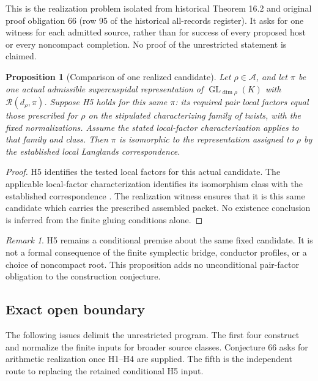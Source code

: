 \documentclass[11pt]{amsart}
\newtheorem{proposition}[proposition]{Proposition}
\theoremstyle{definition}
\theoremstyle{remark}
\newtheorem{remark}[remark]{Remark}
\newcommand{\GL}{\operatorname{GL}}
\begin{document}
\noindent This is the realization problem isolated from historical
Theorem 16.2 and original proof obligation 66 (row 95 of the historical
all-records register). It asks for one witness for each
admitted source, rather than for success of every proposed host or every
noncompact completion. No proof of the unrestricted statement is claimed.

\begin{proposition}[Comparison of one realized candidate]
\label{prop:realized_candidate_comparison}
Let \(\rho\in\mathcal A\), and let \(\pi\) be one actual admissible
supercuspidal representation of \(\GL_{\dim\rho}(K)\) with
\(\mathcal R(d_\rho,\pi)\). Suppose H5 holds for this same \(\pi\):
its required pair local factors equal those prescribed for \(\rho\)
on the stipulated characterizing family of twists, with the fixed
normalizations. Assume the stated local-factor characterization applies
to that family and class. Then \(\pi\) is isomorphic to the representation
assigned to \(\rho\) by the established local Langlands correspondence.
\end{proposition}

\begin{proof}
H5 identifies the tested local factors for this actual candidate. The
applicable local-factor characterization identifies its isomorphism
class with the established correspondence \cite{Henniart1993}. The
realization witness ensures that it is this same candidate which carries
the prescribed assembled packet. No existence conclusion is inferred
from the finite gluing conditions alone.
\end{proof}

\begin{remark}\label{rem:conditional_not_proof}
H5 remains a conditional premise about the same fixed candidate. It is
not a formal consequence of the finite symplectic bridge, conductor
profiles, or a choice of noncompact root. This proposition adds no
unconditional pair-factor obligation to the construction conjecture.
\end{remark}

\subsection{Exact open boundary}

The following issues delimit the unrestricted program. The first four construct and normalize the finite inputs for broader source classes. Conjecture 66 asks for arithmetic realization once H1--H4 are supplied. The fifth is the independent route to replacing the retained conditional H5 input.
\end{document}
